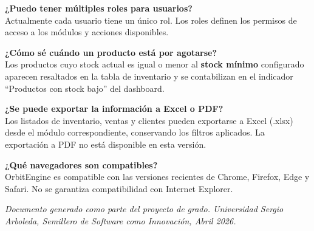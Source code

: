 \textbf{¿Puedo tener múltiples roles para usuarios?}\\
Actualmente cada usuario tiene un único rol. Los roles definen los permisos de acceso a los módulos y acciones disponibles.

\textbf{¿Cómo sé cuándo un producto está por agotarse?}\\
Los productos cuyo stock actual es igual o menor al \textbf{stock mínimo} configurado aparecen resaltados en la tabla de inventario y se contabilizan en el indicador ``Productos con stock bajo'' del dashboard.

\textbf{¿Se puede exportar la información a Excel o PDF?}\\
Los listados de inventario, ventas y clientes pueden exportarse a Excel (.xlsx) desde el módulo correspondiente, conservando los filtros aplicados. La exportación a PDF no está disponible en esta versión.

\textbf{¿Qué navegadores son compatibles?}\\
OrbitEngine es compatible con las versiones recientes de Chrome, Firefox, Edge y Safari. No se garantiza compatibilidad con Internet Explorer.

\emph{Documento generado como parte del proyecto de grado. Universidad Sergio Arboleda, Semillero de Software como Innovación, Abril 2026.}
